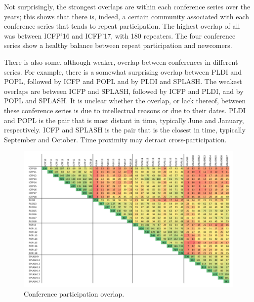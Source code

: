 Not surprisingly, the strongest overlaps are within each conference series over the years; this shows that there is, indeed, a certain community associated with each conference series that tends to repeat participation. The highest overlap of all was between ICFP'16 and ICFP'17, with 180 repeaters. The four conference series show a healthy balance between repeat participation and newcomers. 

There is also some, although weaker, overlap between conferences in different series. For example, there is a somewhat surprising overlap between PLDI and POPL, followed by ICFP and POPL and by PLDI and SPLASH. The weakest overlaps are between ICFP and SPLASH, followed by ICFP and PLDI, and by POPL and SPLASH. It is unclear whether the overlap, or lack thereof, between these conference series is due to intellectual reasons or due to their dates. PLDI and POPL is the pair that is most distant in time, typically June and January, respectively. ICFP and SPLASH is the pair that is the closest in time, typically September and October. Time proximity may detract cross-participation.

\begin{figure}
  \centering
  \includegraphics[width=\textwidth]{figs/OverlapAnalysis-crop.pdf}
  \caption{Conference participation overlap.}
  \label{fig:overlap}
\end{figure}
